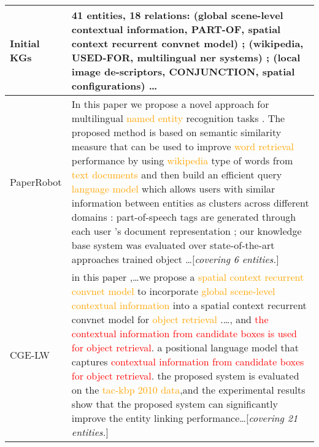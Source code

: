 \documentclass[letterpaper]{article}
\begin{document}
\begin{table*}[t]
    \begin{center}
	\centering
	\begin{tabular}{l p{15cm}}
	\toprule
	
        Initial KGs & \textbf{41} entities, \textbf{18} relations: (global scene-level contextual information, PART-OF, spatial context recurrent convnet model) ; (wikipedia, USED-FOR, multilingual ner systems) ; (local image de-scriptors, CONJUNCTION, spatial configurations)
        \dots
        \\ \midrule
        
        PaperRobot & In this paper we propose a novel approach for multilingual \textcolor{orange}{named entity} recognition tasks  . The proposed method is based on semantic similarity measure that can be used to improve \textcolor{orange}{word retrieval} performance by using \textcolor{orange}{wikipedia} type of words from \textcolor{orange}{text documents} and then build an efficient query \textcolor{orange}{language model} which allows users with similar information between entities as clusters across different domains : part-of-speech tags are generated through each user 's document representation ; our knowledge base system was evaluated over state-of-the-art approaches trained object \dots   [\textit{covering 6 entities.}]
        
         \\ 
    		CGE-LW  &  in this paper ,\dots we propose a \textcolor{orange}{spatial context recurrent convnet model} to incorporate \textcolor{orange}{global scene-level contextual information} into a spatial context recurrent convnet model for \textcolor{orange}{object retrieval} .\dots, and \textcolor{red}{the contextual information from candidate boxes is used for object retrieval}. a positional language model that captures \textcolor{red}{contextual information from candidate boxes for object retrieval}. the proposed system is evaluated on the \textcolor{orange}{tac-kbp 2010 data},and the experimental results show that the proposed system can significantly improve the entity linking performance\dots [\textit{covering 21 entities.}]
		 


\end{tabular}
\end{center}
\end{table*}
\end{document}
